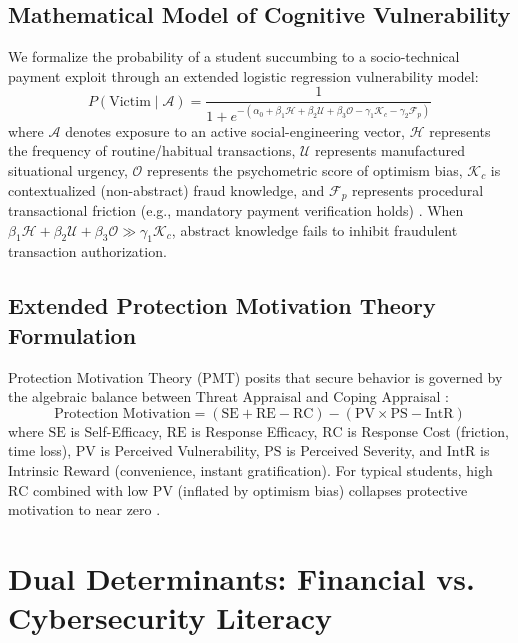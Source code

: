 \documentclass[journal,10pt,twocolumn]{IEEEtran}
\begin{document}
\subsection{Mathematical Model of Cognitive Vulnerability}
We formalize the probability of a student succumbing to a socio-technical payment exploit through an extended logistic regression vulnerability model:
\begin{equation}
P(\text{Victim} \mid \mathcal{A}) = \frac{1}{1 + e^{-(\alpha_0 + \beta_1 \mathcal{H} + \beta_2 \mathcal{U} + \beta_3 \mathcal{O} - \gamma_1 \mathcal{K}_c - \gamma_2 \mathcal{F}_p)}}
\end{equation}
where $\mathcal{A}$ denotes exposure to an active social-engineering vector, $\mathcal{H}$ represents the frequency of routine/habitual transactions, $\mathcal{U}$ represents manufactured situational urgency, $\mathcal{O}$ represents the psychometric score of optimism bias, $\mathcal{K}_c$ is contextualized (non-abstract) fraud knowledge, and $\mathcal{F}_p$ represents procedural transactional friction (e.g., mandatory payment verification holds) \cite{emerald2024, newsonair2026, systems2024}. When $\beta_1 \mathcal{H} + \beta_2 \mathcal{U} + \beta_3 \mathcal{O} \gg \gamma_1 \mathcal{K}_c$, abstract knowledge fails to inhibit fraudulent transaction authorization.

\subsection{Extended Protection Motivation Theory Formulation}
Protection Motivation Theory (PMT) posits that secure behavior is governed by the algebraic balance between Threat Appraisal and Coping Appraisal \cite{arxiv2024, sciencedirect2024}:
\begin{equation}
\text{Protection Motivation} = (\text{SE} + \text{RE} - \text{RC}) - (\text{PV} \times \text{PS} - \text{IntR})
\end{equation}
where $\text{SE}$ is Self-Efficacy, $\text{RE}$ is Response Efficacy, $\text{RC}$ is Response Cost (friction, time loss), $\text{PV}$ is Perceived Vulnerability, $\text{PS}$ is Perceived Severity, and $\text{IntR}$ is Intrinsic Reward (convenience, instant gratification). For typical students, high $\text{RC}$ combined with low $\text{PV}$ (inflated by optimism bias) collapses protective motivation to near zero \cite{arxiv2024, sciencedirect2024}.

\section{Dual Determinants: Financial vs. Cybersecurity Literacy}
\end{document}
